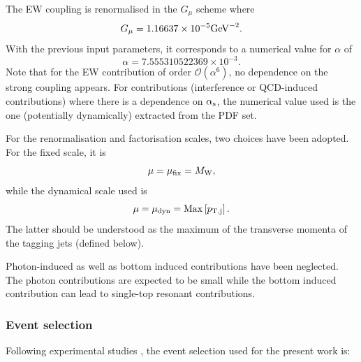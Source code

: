 \documentclass[11pt]{cernrep}
\newcommand{\MP}[1]{{ {\color{blue}{ [MP: #1]}} }}
\begin{document}
%
The EW coupling is renormalised in the $G_\mu$ scheme \cite{Denner:2000bj} where
%
\begin{equation}
    G_{\mu}    = 1.16637\times 10^{-5}{\rm GeV}^{-2}.
\end{equation}
%
With the previous input parameters, it corresponds to a numerical value for $\alpha$ of
%
\begin{equation}
 \alpha = 7.555310522369 \times 10^{-3}.
\end{equation}
%
Note that for the EW contribution of order $\mathcal{O} (\alpha^6)$, no dependence on the strong coupling appears.
For contributions (interference or QCD-induced contributions) where there is a dependence on $\alpha_{\rm s}$, the numerical value used is the one (potentially dynamically) extracted from the PDF set.

For the renormalisation and factorisation scales, two choices have been adopted.
For the fixed scale, it is
%
\begin{equation}
 \mu = \mu_{\rm fix} = M_{\rm W},
\end{equation}
%
while the dynamical scale used is
%
\begin{equation}
 \mu = \mu_{\rm dyn} = {\rm Max}\left[p_{\rm T, j}\right].
\end{equation}
%
The latter should be understood as the maximum of the transverse momenta of the tagging jets (defined below).
\MP{Justification for this scale choice?}

Photon-induced as well as bottom induced contributions have been neglected.
The photon contributions are expected to be small \cite{Biedermann:2017bss} while the bottom induced contribution can lead to single-top resonant contributions.

\subsubsection*{Event selection}

Following experimental studies \cite{Aad:2016ett,CMS-PAS-SMP-14-008}, the event selection used for the present work is:
\end{document}
